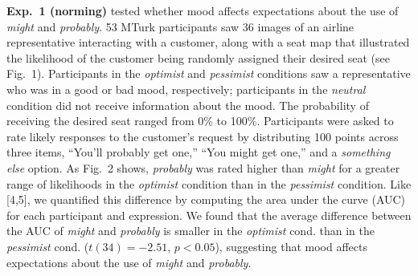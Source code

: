 \documentclass[11pt]{article}
\newcommand{\opt}[1]{\textcolor{OptColor}{#1}}
\newcommand{\pes}[1]{\textcolor{PesColor}{#1}}
\newcommand{\neu}[1]{\textcolor{NeuColor}{#1}}
\begin{document}
\noindent \textbf{Exp.~1 (norming)} tested whether mood affects expectations about the use of \textit{might} and \textit{probably}.  53 MTurk participants saw 36 images of an airline representative interacting with a customer, along with a seat map that illustrated the likelihood of the customer being randomly assigned their desired seat (see Fig.~1). Participants in the \textit{\opt{optimist}} and \textit{\pes{pessimist}} conditions saw a representative who was in a good or bad mood, respectively; participants in the \textit{\neu{neutral}} condition did not receive information about the mood. The probability of receiving the desired seat ranged from  0\% to 100\%. Participants were asked to rate likely responses to the customer's request by distributing 100 points across three items, ``You'll probably get one,'' ``You might get one,'' and a \textit{something else} option. As Fig.~2 shows, \textit{probably} was rated higher than \textit{might} for a greater range of likelihoods in the \textit{\opt{optimist}} condition than in the \textit{\pes{pessimist}} condition. Like [4,5], we quantified this difference by  computing the area under the curve (AUC) for each participant and expression. We found that the average difference between the AUC of \textit{might} and \textit{probably} is smaller in the \textit{\opt{optimist}} cond. than in the \textit{\pes{pessimist}} cond. ($t(34)=-2.51$, $p < 0.05$), suggesting that mood affects expectations about the use of \textit{might} and \textit{probably}. 
\end{document}
